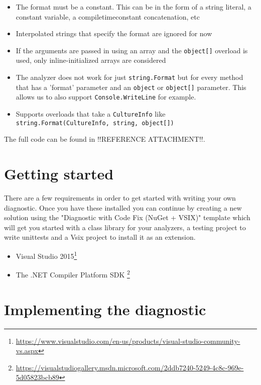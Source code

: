 \begin{itemize}
\item The format must be a constant. This can be in the form of a string literal, a constant variable, a \gls{compiletimeconstant} concatenation, etc
\item Interpolated strings that specify the format are ignored for now
\item If the arguments are passed in using an array and the \texttt{object[]} overload is used, only inline-initialized arrays are considered
\item The analyzer does not work for just \texttt{string.Format} but for every method that has a 'format' parameter and an \texttt{object} or \texttt{object[]} parameter. This allows us to also support \texttt{Console.WriteLine} for example.
\item Supports overloads that take a \texttt{CultureInfo} like \texttt{string.Format(CultureInfo, string, object[])}
\end{itemize}

The full code can be found in !!REFERENCE ATTACHMENT!!.


\section{Getting started}
\label{sec:diagnostic-getting-started}

There are a few requirements in order to get started with writing your own diagnostic. Once you have these installed you can continue by creating a new \gls{solution} using the "Diagnostic with Code Fix (NuGet + VSIX)" template which will get you started with a class library for your analyzers, a testing project to write \glspl{unittest} and a Vsix project to install it as an extension.

\begin{itemize}
\item Visual Studio 2015\footnote{\url{https://www.visualstudio.com/en-us/products/visual-studio-community-vs.aspx}}
\item The .NET Compiler Platform SDK \footnote{\url{https://visualstudiogallery.msdn.microsoft.com/2ddb7240-5249-4c8c-969e-5d05823bcb89}}
\end{itemize}

\section{Implementing the diagnostic}
\label{sec:diagnostic-implementation}

